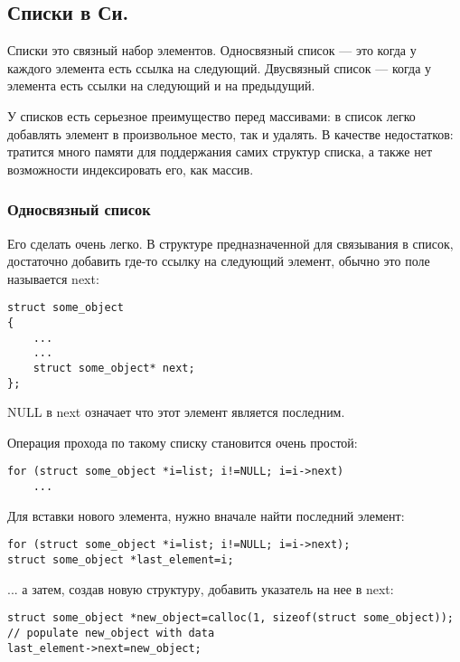 \subsection{Списки в Си.}

Списки это связный набор элементов. Односвязный список --- это когда у каждого элемента есть ссылка на следующий.
Двусвязный список --- когда у элемента есть ссылки на следующий и на предыдущий.

У списков есть серьезное преимущество перед массивами: в список легко добавлять элемент в произвольное место,
так и удалять. В качестве недостатков: тратится много памяти для поддержания самих структур списка, а также
нет возможности индексировать его, как массив.

\subsubsection{Односвязный список}

Его сделать очень легко. В структуре предназначенной для связывания в список, достаточно добавить где-то
ссылку на следующий элемент, обычно это поле называется next:

\begin{lstlisting}
struct some_object
{
	...
	...
	struct some_object* next;
};
\end{lstlisting}

NULL в next означает что этот элемент является последним.

Операция прохода по такому списку становится очень простой:

\begin{lstlisting}
for (struct some_object *i=list; i!=NULL; i=i->next)
	...
\end{lstlisting}

Для вставки нового элемента, нужно вначале найти последний элемент:

\begin{lstlisting}
for (struct some_object *i=list; i!=NULL; i=i->next);
struct some_object *last_element=i;
\end{lstlisting}

... а затем, создав новую структуру, добавить указатель на нее в next:

\begin{lstlisting}
struct some_object *new_object=calloc(1, sizeof(struct some_object));
// populate new_object with data
last_element->next=new_object;
\end{lstlisting}

